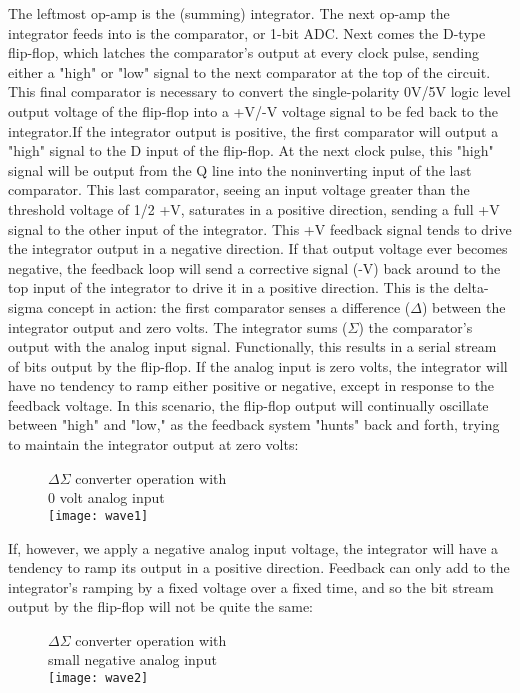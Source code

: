 The leftmost op-amp is the (summing) integrator. The next op-amp the
integrator feeds into is the comparator, or 1-bit ADC. Next comes the
D-type flip-flop, which latches the comparator's output at every clock
pulse, sending either a "high" or "low" signal to the next comparator at
the top of the circuit. This final comparator is necessary to convert the
single-polarity 0V/5V logic level output voltage of the flip-flop into a
+V/-V voltage signal to be fed back to the integrator.If the integrator
output is positive, the first comparator will output a "high" signal to the D
input of the flip-flop. At the next clock pulse, this "high" signal will be
output from the Q line into the noninverting input of the last comparator.
This last comparator, seeing an input voltage greater than the threshold
voltage of 1/2 +V, saturates in a positive direction, sending a full +V
signal to the other input of the integrator. This +V feedback signal tends
to drive the integrator output in a negative direction. If that output
voltage ever becomes negative, the feedback loop will send a corrective
signal (-V) back around to the top input of the integrator to drive it in
a positive direction. This is the delta-sigma concept in action: the first
comparator senses a difference ($\Delta$) between the integrator output and
zero volts. The integrator sums ($\Sigma$) the comparator's output with the
analog input signal. Functionally, this results in a serial stream of bits
output by the flip-flop. If the analog input is zero volts, the integrator
will have no tendency to ramp either positive or negative, except in
response to the feedback voltage. In this scenario, the flip-flop output
will continually oscillate between "high" and "low," as the feedback system
"hunts" back and forth, trying to maintain the integrator output at zero
volts: 
 
\begin{figure}[!h]
\centering
$\Delta\Sigma$ converter operation with\\ 0 volt analog input\\
\texttt{[image: wave1]}
\end{figure}

If, however, we apply a negative analog input voltage, the integrator will
have a tendency to ramp its output in a positive direction. Feedback can
only add to the integrator's ramping by a fixed voltage over a fixed time,
and so the bit stream output by the flip-flop will not be quite the same: 

\begin{figure}[!h]
\centering
$\Delta\Sigma$ converter operation with\\ small negative analog input\\
\texttt{[image: wave2]}
\end{figure}

